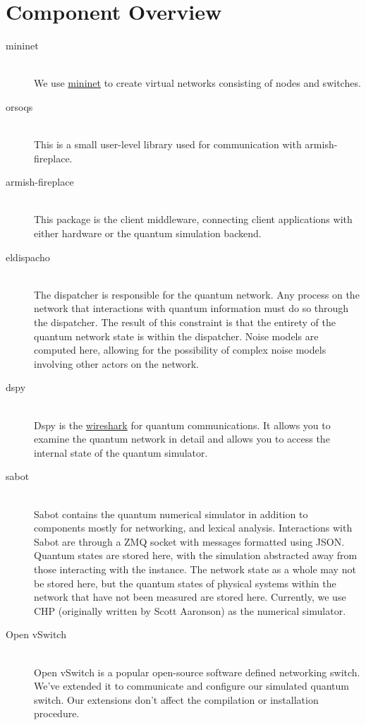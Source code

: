 \documentclass[letterpaper,twoside=false]{scrbook}
\begin{document}
\chapter{Component Overview}
	\begin{description}
		\item[mininet] \hfill \\
		We use \href{www.mininet.org}{mininet} to create virtual networks consisting of nodes and switches.
		
		\item[orsoqs] \hfill \\
		This is a small user-level library used for communication with armish-fireplace.
		
		\item[armish-fireplace] \hfill \\
		This package is the client middleware, connecting client applications with either hardware or the quantum simulation backend. 
		
		\item[eldispacho] \hfill \\
		The dispatcher is responsible for the quantum network. Any process on the network that interactions with quantum information must do so through the dispatcher. The result of this constraint is that the entirety of the quantum network state is within the dispatcher. Noise models are computed here, allowing for the possibility of complex noise models involving other actors on the network.
		
		\item[dspy] \hfill \\
		Dspy is the \href{www.wireshark.org}{wireshark} for quantum communications. It allows you to examine the quantum network in detail and allows you to access the internal state of the quantum simulator.
		
		\item[sabot] \hfill \\
		Sabot contains the quantum numerical simulator in addition to components mostly for networking, and lexical analysis. Interactions with Sabot are through a ZMQ socket with messages formatted using JSON. Quantum states are stored here, with the simulation abstracted away from those interacting with the instance. The network state as a whole may not be stored here, but the quantum states of physical systems within the network that have not been measured are stored here. Currently, we use CHP (originally written by Scott Aaronson) as the numerical simulator.
		
		\item[Open vSwitch] \hfill \\
		Open vSwitch is a popular open-source software defined networking switch. We've extended it to communicate and configure our simulated quantum switch. Our extensions don't affect the compilation or installation procedure.
	\end{description}
\end{document}
